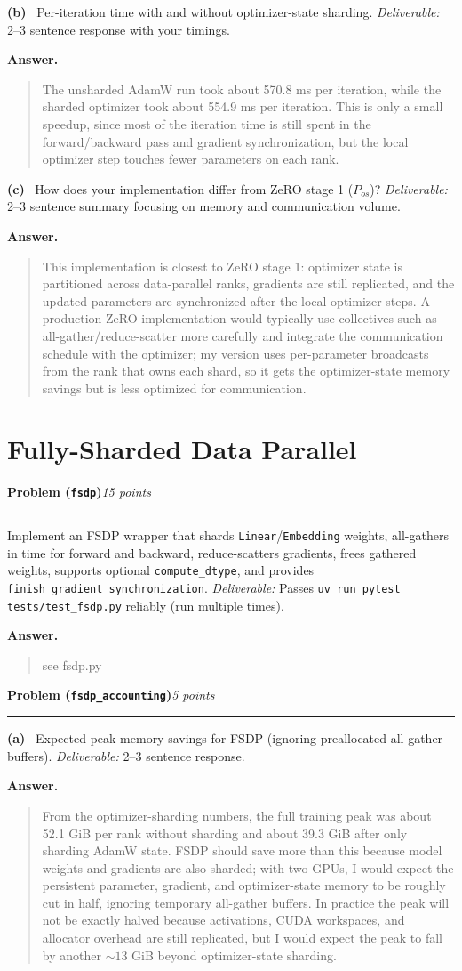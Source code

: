 \documentclass[11pt]{article}
\newcommand{\problem}[2]{%
  \vspace{0.6em}%
  \noindent\textbf{Problem (\texttt{#1})}\hfill\textit{#2 points}\par%
  \vspace{0.2em}\hrule\vspace{0.4em}%
}
\newcommand{\subq}[1]{\vspace{0.3em}\noindent\textbf{(#1)}\ }
\newcommand{\deliverable}[1]{\vspace{0.2em}\noindent\textit{Deliverable:} #1\par}
\newenvironment{answer}{%
  \vspace{0.3em}%
  \noindent\textbf{Answer.}\begin{quote}%
}{%
  \end{quote}\vspace{0.4em}%
}
\begin{document}
\subq{b} Per-iteration time with and without optimizer-state sharding.
\deliverable{2--3 sentence response with your timings.}
\begin{answer}
  The unsharded AdamW run took about 570.8 ms per iteration, while the sharded optimizer took about 554.9 ms per iteration.  This is only a small speedup, since most of the iteration time is still spent in the forward/backward pass and gradient synchronization, but the local optimizer step touches fewer parameters on each rank.
\end{answer}

\subq{c} How does your implementation differ from ZeRO stage 1 ($P_{os}$)?
\deliverable{2--3 sentence summary focusing on memory and communication volume.}
\begin{answer}
  This implementation is closest to ZeRO stage 1: optimizer state is partitioned across data-parallel ranks, gradients are still replicated, and the updated parameters are synchronized after the local optimizer steps.  A production ZeRO implementation would typically use collectives such as all-gather/reduce-scatter more carefully and integrate the communication schedule with the optimizer; my version uses per-parameter broadcasts from the rank that owns each shard, so it gets the optimizer-state memory savings but is less optimized for communication.
\end{answer}


\section{Fully-Sharded Data Parallel}

\problem{fsdp}{15}
Implement an FSDP wrapper that shards \texttt{Linear}/\texttt{Embedding} weights, all-gathers in time for forward and backward, reduce-scatters gradients, frees gathered weights, supports optional \texttt{compute\_dtype}, and provides \texttt{finish\_gradient\_synchronization}.
\deliverable{Passes \texttt{uv run pytest tests/test\_fsdp.py} reliably (run multiple times).}
\begin{answer}
  see fsdp.py
\end{answer}


\problem{fsdp\_accounting}{5}

\subq{a} Expected peak-memory savings for FSDP (ignoring preallocated all-gather buffers).
\deliverable{2--3 sentence response.}
\begin{answer}
  From the optimizer-sharding numbers, the full training peak was about 52.1 GiB per rank without sharding and about 39.3 GiB after only sharding AdamW state. FSDP should save more than this because model weights and gradients are also sharded; with two GPUs, I would expect the persistent parameter, gradient, and optimizer-state memory to be roughly cut in half, ignoring temporary all-gather buffers. In practice the peak will not be exactly halved because activations, CUDA workspaces, and allocator overhead are still replicated, but I would expect the peak to fall by another \(\sim 13\) GiB beyond optimizer-state sharding.
\end{answer}
\end{document}

